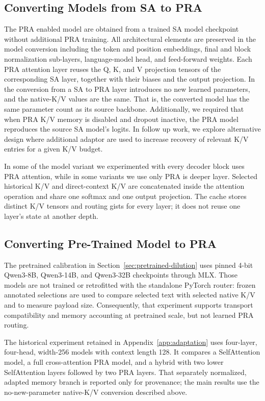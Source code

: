 \documentclass[11pt]{article}
\begin{document}
\subsection{Converting Models from SA to PRA}

The PRA enabled model are obtained from a trained SA model checkpoint without
additional PRA training. All architectural elements are preserved in the model conversion
including the token and position embeddings, final
and block normalization sub-layers, language-model head, and feed-forward weights.
Each PRA attention layer reuses the Q, K, and V projection tensors of the corresponding SA layer,
together with their biases and the output projection.
In the conversion from a SA to PRA layer introduces no new learned
parameters, and the native-K/V values are the same.
That is, the converted model has the same parameter count as its source backbone.
Additionally, we required that when PRA K/V memory is disabled and dropout inactive,
the PRA model reproduces the source SA model's logits. In follow up work,
we explore alternative design where additional adaptor are used to increase
recovery of relevant K/V entries for a given K/V budget. 

In some of the model variant we experimented with every decoder block uses PRA attention,
while in some variants we use only PRA is deeper layer.
Selected historical K/V and direct-context K/V are concatenated
inside the attention operation and share one softmax and one output projection. 
The cache stores distinct K/V tensors and routing gists for every layer; 
it does not reuse one layer's state at another depth.

\subsection{Converting Pre-Trained Model to PRA}

The pretrained calibration in Section~\ref{sec:pretrained-dilution} uses pinned 4-bit
Qwen3-8B, Qwen3-14B, and Qwen3-32B checkpoints through MLX. Those models are not trained
or retrofitted with the standalone PyTorch router: frozen annotated selections are used to
compare selected text with selected native K/V and to measure payload size. Consequently,
that experiment supports transport compatibility and memory accounting at pretrained
scale, but not learned PRA routing.

The historical experiment retained in Appendix~\ref{app:adaptation} uses four-layer,
four-head, width-256 models with context length 128. It compares a SelfAttention model,
a full cross-attention PRA model, and a hybrid with two lower SelfAttention layers followed
by two PRA layers. That separately normalized, adapted memory branch is reported only for
provenance; the main results use the no-new-parameter native-K/V conversion described above.
\end{document}
